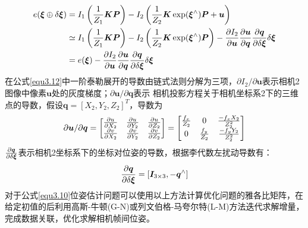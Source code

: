 \begin{equation}
\label{equ3.12}
\begin{aligned}
e(\boldsymbol{\xi}\oplus \delta \boldsymbol{\xi}) &= I_1\left({1 \over Z_1} \boldsymbol{K} \boldsymbol{P} \right) - I_2 \left({1 \over Z_2} \boldsymbol{K} \exp (\boldsymbol{\xi}^{\wedge}) \boldsymbol{P}+ \boldsymbol{u} \right) 
\\ 
& \simeq I_1\left({1 \over Z_1} \boldsymbol{K} \boldsymbol{P} \right) - I_2 \left({1 \over Z_2} \boldsymbol{K} \exp (\boldsymbol{\xi}^{\wedge}) \boldsymbol{P} \right) - {\partial I_2 \over \partial \boldsymbol{u}} {\partial \boldsymbol{u} \over \partial \boldsymbol{q}} {\partial \boldsymbol{q} \over \partial \delta \boldsymbol{\xi}} \delta \boldsymbol{\xi}
\\
& = e(\boldsymbol{\xi}) - {\partial I_2 \over \partial \boldsymbol{u}} {\partial \boldsymbol{u} \over \partial \boldsymbol{q}} {\partial \boldsymbol{q} \over \partial \delta \boldsymbol{\xi}} \delta \boldsymbol{\xi}
\end{aligned}
\end{equation}
在公式\eqref{equ3.12}中一阶泰勒展开的导数由链式法则分解为三项，$\partial I_2 / \partial \boldsymbol{u}$表示相机2图像中像素$\boldsymbol{u}$处的灰度梯度；$\partial \boldsymbol{u} / \partial \boldsymbol{q}$表示
相机投影方程关于相机坐标系2下的三维点的导数，假设$\boldsymbol{q} = \left[X_2,Y_2,Z_2 \right]^T$，导数为
\begin{equation}
\label{equ3.13}
{ \partial \boldsymbol{u} / \partial \boldsymbol{q} } = 
\begin{bmatrix}
\partial u \over \partial X_2 & \partial u \over \partial Y_2 & \partial u \over \partial Z_2 \cr
\partial v \over \partial X_2 & \partial v \over \partial Y_2 & \partial v \over \partial Z_2 \cr
\end{bmatrix} = 
\begin{bmatrix}
f_x \over Z_2 & 0 & -f_x X_2 \over Z_2^2 \cr
0 & f_y \over Z_2 & - f_y Y_2 \over Z_2^2 \cr
\end{bmatrix}
\end{equation}
${\partial \boldsymbol{q} \over \partial \delta \boldsymbol{\xi}}$表示相机2坐标系下的坐标对位姿的导数，根据李代数左扰动导数有：
\begin{equation}
\label{equ3.14}
{\partial \boldsymbol{q} \over \partial \delta \boldsymbol{\xi}} = \left[\boldsymbol{I}_{3\times 3},-\boldsymbol{q}^{\wedge} \right]
\end{equation}
对于公式\eqref{equ3.10}位姿估计问题可以使用以上方法计算优化问题的雅各比矩阵，在给定初值的后利用高斯-牛顿(G-N)或列文伯格-马夸尔特(L-M)方法迭代求解增量，完成数据关联，优化求解相机帧间位姿。




